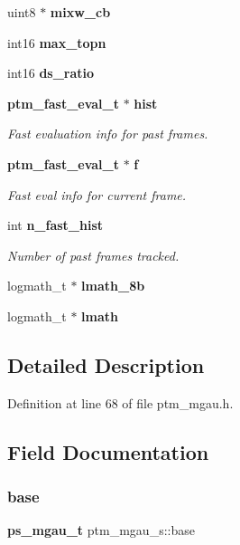 \begin{DoxyCompactItemize}
\item 
\mbox{\label{structptm__mgau__s_a5a3c76d47b94978f717a65fa0dfb54e8}} 
uint8 $\ast$ {\bfseries mixw\+\_\+cb}
\item 
\mbox{\label{structptm__mgau__s_ab397cfdf51d309de4521edc09e80541d}} 
int16 {\bfseries max\+\_\+topn}
\item 
\mbox{\label{structptm__mgau__s_a2254b6ec79c97516b326ad33d22d0050}} 
int16 {\bfseries ds\+\_\+ratio}
\item 
\textbf{ ptm\+\_\+fast\+\_\+eval\+\_\+t} $\ast$ \textbf{ hist}
\begin{DoxyCompactList}\small\item\em Fast evaluation info for past frames. \end{DoxyCompactList}\item 
\textbf{ ptm\+\_\+fast\+\_\+eval\+\_\+t} $\ast$ \textbf{ f}
\begin{DoxyCompactList}\small\item\em Fast eval info for current frame. \end{DoxyCompactList}\item 
int \textbf{ n\+\_\+fast\+\_\+hist}
\begin{DoxyCompactList}\small\item\em Number of past frames tracked. \end{DoxyCompactList}\item 
\mbox{\label{structptm__mgau__s_ad577181af2afca66f33f1f1e4c576ae8}} 
logmath\+\_\+t $\ast$ {\bfseries lmath\+\_\+8b}
\item 
\mbox{\label{structptm__mgau__s_abbaabfb8678356673a2c0a515e33a378}} 
logmath\+\_\+t $\ast$ {\bfseries lmath}
\end{DoxyCompactItemize}


\subsection{Detailed Description}


Definition at line 68 of file ptm\+\_\+mgau.\+h.



\subsection{Field Documentation}
\mbox{\label{structptm__mgau__s_ac7ccb744c03564e3c1b360b3436cb3a1}} 
\subsubsection{base}
{\footnotesize\ttfamily \textbf{ ps\+\_\+mgau\+\_\+t} ptm\+\_\+mgau\+\_\+s\+::base}



